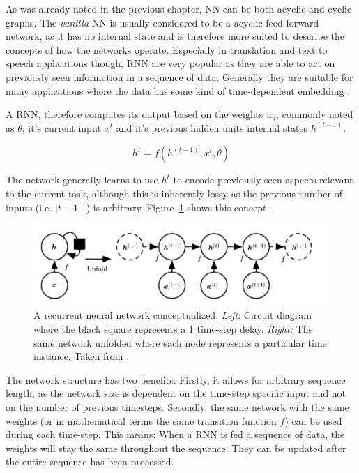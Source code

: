 As was already noted in the previous chapter, \ac {NN} can be both acyclic and cyclic graphs. The
\emph{vanilla} \ac {NN} is usually considered to be a acyclic feed-forward network, as it has no internal state and is
therefore more suited to describe the concepts of how the networks operate. Especially in translation and text to speech
applications though, \ac {RNN} are very popular as they are able to act on previously seen information in a sequence of
data. Generally they are suitable for many applications where the data has some kind of time-dependent embedding
\cite[p.373]{Goodfellow-et-al-2016}.

A \ac {RNN}, therefore computes its output based on the weights $w_i$, commonly noted as $\theta$, it's current input
$x^t$ and it's previous hidden units internal states $h^(t-1)$.

\[
    h^t = f(h^(t-1), x^t, \theta)
\]

The network generally learns to use $h^t$ to encode previously seen aspects relevant to the current task, although this
is inherently lossy as the previous number of inputs (i.e. $\mid t-1\mid$) is arbitrary. Figure~\ref{fig:rnn_concept}
shows this concept.

\begin{figure}[]
    \centering
    \includegraphics[width=0.8\linewidth]{img/rnn_concept.png}
    \caption{A recurrent neural network conceptualized. \emph{Left}: Circuit diagram where the black square represents a
    1 time-step delay. \emph{Right:} The same network unfolded where each node represents a particular time instance.
    Taken from \citet{Goodfellow-et-al-2016}.}
    \label{fig:rnn_concept}
\end{figure}

The network structure has two benefits: Firstly, it allows for arbitrary sequence length, as the network size is
dependent on the time-step specific input and not on the number of previous timesteps. Secondly, the same network with
the same weights (or in mathematical terms the same transition function $f$) can be used during each time-step. This
means: When a \ac {RNN} is fed a sequence of data, the weights will stay the same throughout the sequence. They can be
updated after the entire sequence has been processed. 
